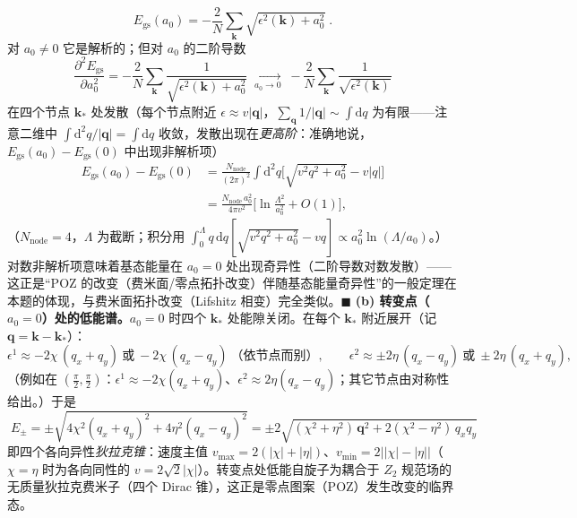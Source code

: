 \begin{equation*}
E_{\text{gs}}(a_0)=-\frac{2}{N}\sum_{\pmb{k}}\sqrt{\epsilon^{2}(\pmb{k})+a_0^{2}}\; .
\end{equation*}
对 $a_0\neq0$ 它是解析的；但对 $a_0$ 的二阶导数
\begin{equation*}
\frac{\partial^{2}E_{\text{gs}}}{\partial a_0^{2}}
=-\frac{2}{N}\sum_{\pmb{k}}\frac{1}{\sqrt{\epsilon^{2}(\pmb{k})+a_0^{2}}}
\;\xrightarrow[a_0\to0]{}\;-\frac{2}{N}\sum_{\pmb{k}}\frac{1}{\sqrt{\epsilon^{2}(\pmb{k})}}
\end{equation*}
在四个节点 $\pmb{k}_*$ 处发散（每个节点附近 $\epsilon\approx v|\pmb{q}|$，$\sum_{\pmb{q}}1/|\pmb{q}|\sim\int \mathrm{d}q$ 为有限——注意二维中 $\int\mathrm{d}^2q/|\pmb{q}|=\int\mathrm{d}q$ 收敛，发散出现在\emph{更高阶}：准确地说，$E_{\text{gs}}(a_0)-E_{\text{gs}}(0)$ 中出现非解析项）
\begin{align*}
E_{\text{gs}}(a_0)-E_{\text{gs}}(0)
&=\frac{N_{\text{node}}}{(2\pi)^{2}}\int \mathrm{d}^{2}q\Big[\sqrt{v^{2}q^{2}+a_0^{2}}-v|q|\Big]\\
&=\frac{N_{\text{node}}\,a_0^{2}}{4\pi v^{2}}\Big[\ln\frac{\Lambda^{2}}{a_0^{2}}+O(1)\Big] ,
\end{align*}
（$N_{\text{node}}=4$，$\Lambda$ 为截断；积分用 $\int_0^\Lambda q\,\mathrm{d}q[\sqrt{v^2q^2+a_0^2}-vq]\propto a_0^2\ln(\Lambda/a_0)$。）对数非解析项意味着基态能量在 $a_0=0$ 处出现奇异性（二阶导数对数发散）——这正是“POZ 的改变（费米面/零点拓扑改变）伴随基态能量奇异性”的一般定理在本题的体现，与费米面拓扑改变（Lifshitz 相变）完全类似。$\blacksquare$
\textbf{(b) 转变点（$a_0=0$）处的低能谱。}$a_0=0$ 时四个 $\pmb{k}_*$ 处能隙关闭。在每个 $\pmb{k}_*$ 附近展开（记 $\pmb{q}=\pmb{k}-\pmb{k}_*$）：
\begin{equation*}
\epsilon^{1}\approx-2\chi\,(q_x+q_y)\ \text{或}\ -2\chi\,(q_x-q_y)\ \text{（依节点而别）},\qquad
\epsilon^{2}\approx\pm2\eta\,(q_x-q_y)\ \text{或}\ \pm2\eta\,(q_x+q_y),
\end{equation*}
（例如在 $(\tfrac{\pi}{2},\tfrac{\pi}{2})$：$\epsilon^{1}\approx-2\chi(q_x+q_y)$、$\epsilon^{2}\approx2\eta(q_x-q_y)$；其它节点由对称性给出。）于是
\begin{equation*}
\boxed{\;E_{\pm}=\pm\sqrt{4\chi^{2}(q_x+q_y)^{2}+4\eta^{2}(q_x-q_y)^{2}}
=\pm2\sqrt{(\chi^{2}+\eta^{2})\,\pmb{q}^{2}+2(\chi^{2}-\eta^{2})\,q_xq_y}\;}
\end{equation*}
即四个各向异性\emph{狄拉克锥}：速度主值 $v_{\max}=2(|\chi|+|\eta|)$、$v_{\min}=2\big||\chi|-|\eta|\big|$（$\chi=\eta$ 时为各向同性的 $v=2\sqrt2|\chi|$）。转变点处低能自旋子为耦合于 $Z_2$ 规范场的无质量狄拉克费米子（四个 Dirac 锥），这正是零点图案（POZ）发生改变的临界态。

